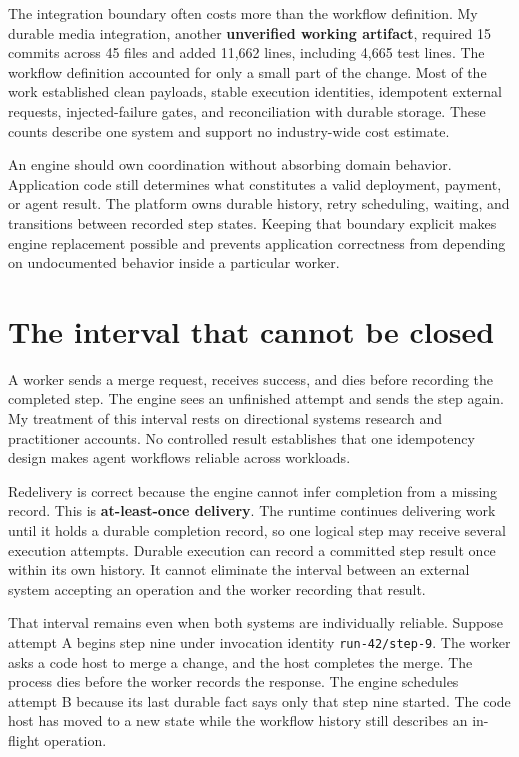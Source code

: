 The integration boundary often costs more than the workflow definition. My durable media integration, another \textbf{unverified working artifact}, required 15 commits across 45 files and added 11,662 lines, including 4,665 test lines. The workflow definition accounted for only a small part of the change. Most of the work established clean payloads, stable execution identities, idempotent external requests, injected-failure gates, and reconciliation with durable storage. These counts describe one system and support no industry-wide cost estimate.

An engine should own coordination without absorbing domain behavior. Application code still determines what constitutes a valid deployment, payment, or agent result. The platform owns durable history, retry scheduling, waiting, and transitions between recorded step states. Keeping that boundary explicit makes engine replacement possible and prevents application correctness from depending on undocumented behavior inside a particular worker.

\section{The interval that cannot be closed}\label{the-interval-that-cannot-be-closed}

A worker sends a merge request, receives success, and dies before recording the completed step. The engine sees an unfinished attempt and sends the step again. My treatment of this interval rests on directional systems research and practitioner accounts. No controlled result establishes that one idempotency design makes agent workflows reliable across workloads.

Redelivery is correct because the engine cannot infer completion from a missing record. This is \textbf{at-least-once delivery}. The runtime continues delivering work until it holds a durable completion record, so one logical step may receive several execution attempts. Durable execution can record a committed step result once within its own history. It cannot eliminate the interval between an external system accepting an operation and the worker recording that result.

That interval remains even when both systems are individually reliable. Suppose attempt A begins step nine under invocation identity \texttt{run-42/step-9}. The worker asks a code host to merge a change, and the host completes the merge. The process dies before the worker records the response. The engine schedules attempt B because its last durable fact says only that step nine started. The code host has moved to a new state while the workflow history still describes an in-flight operation.

